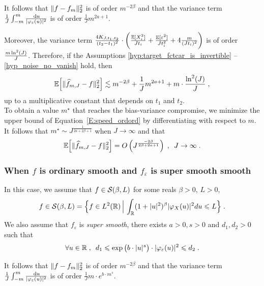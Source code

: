 It follows that $\lVert f - f_m\rVert_2^2$ is of order $m^{-2\beta}$ and that  the variance term $\frac{1}{J} \int_{-m}^{m} \frac{\, \mathrm du}{|\varphi_{\varepsilon}(u)|^2}$ is of order $\frac{1}{J}  m^{2a + 1}$.
	
Moreover, the variance term $\frac{4 K_{J, t_1, t_2}}{(t_2 - t_1)^2} 
	 \cdot \bigg( \frac{\mathbb{E}[X_i^2]}{J t_i} 
			+ \frac{\mathbb{E}[\varepsilon^2]}{J t_i^2} + 4 \frac{m}{(J t_i)^2} \bigg)$ is of order $
        \frac{m \ln^2(J)}{J}$.		
Therefore, if the Assumptions \ref{hyp:target_fctcar_is_invertible} -- \ref{hyp_noise_no_vanish} hold, then
	\begin{equation}
	\mathbb{E} \Big[ \lVert\widehat f_{m, J} - f\rVert_2^2 \Big]
	\lesssim
	m^{-2\beta} + \frac{1}{J} m^{2a + 1} +  m \cdot \frac{\ln^2(J)}{J}
	\; ,
	\label{E:speed_ordord}
	\end{equation}
up to a multiplicative constant that depends on $t_1$ and $t_2$. \\

To obtain a value $m^\star$ that reaches the bias-variance compromise, we minimize the upper bound of Equation~\eqref{E:speed_ordord} by differentiating with respect to $m$. It follows that $m^\star \sim J^{\frac{1}{2a + 2\beta + 1}}$ when $J \to \infty$ and that 
	\begin{equation*}
	\mathbb{E} \Big[ \lVert\widehat f_{m, J} - f\rVert_2^2 \Big]  = O\left( J^{\frac{-2\beta}{2\beta + 2a + 1}} \right)
	\; , \enspace
	J \to \infty
	\; .
	\end{equation*}
\subsubsection*{When $f$ is ordinary smooth and $f_\varepsilon$ is super smooth smooth}\label{sec:smoothsuper}
In this case, we assume that $f \in \mathcal{S}(\beta, L)$ for some reals $\beta > 0$, $L > 0$, \ie
	\begin{equation*}
	f \in \mathcal{S}(\beta, L) 
	= 
	\Big\{ f \in L^2(\mathbb{R}) \, \Big| \, \int_{\mathbb{R}} (1 + |u|^2)^{\beta} |\varphi_X(u)|^2 du \leqslant L \Big\}
	\; .
	\end{equation*}
We also assume that $f_\varepsilon$ is \textit{super smooth}, \ie there exists $a > 0, s > 0$  and $d_1, d_2 > 0$ such that 
	\begin{equation*}
	\forall u \in \mathbb{R} 
	\; , \enspace
	d_1 \leqslant \exp \big( b \cdot |u|^s \big) \cdot |\varphi_\varepsilon(u)|^2 \leqslant d_2
	\; .
	\end{equation*}
	
It follows that $\lVert f - f_m\rVert_2^2$ is of order $ m^{-2\beta}$ and that  the variance term $\frac{1}{J} \int_{-m}^{m} \frac{\, \mathrm du}{|\varphi_{\varepsilon}(u)|^2}$ is of order $\frac{1}{J} m \cdot e^{b\cdot m^s}$.
	
